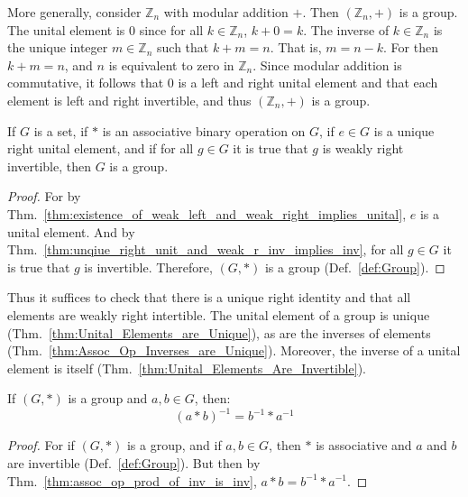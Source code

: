     \begin{example}
        More generally, consider $\mathbb{Z}_{n}$ with modular addition $+$.
        Then $(\mathbb{Z}_{n},+)$ is a group. The unital element is $0$ since
        for all $k\in\mathbb{Z}_{n}$, $k+0=k$. The inverse of
        $k\in\mathbb{Z}_{n}$ is the unique integer $m\in\mathbb{Z}_{n}$ such
        that $k+m=n$. That is, $m=n-k$. For then $k+m=n$, and $n$ is equivalent
        to zero in $\mathbb{Z}_{n}$. Since modular addition is commutative, it
        follows that $0$ is a left and right unital element and that each
        element is left and right invertible, and thus $(\mathbb{Z}_{n},+)$ is a
        group.
    \end{example}
    \begin{theorem}
        If $G$ is a set, if $*$ is an associative binary operation on $G$, if
        $e\in{G}$ is a unique right unital element, and if for all $g\in{G}$ it
        is true that $g$ is weakly right invertible, then $G$ is a group.
    \end{theorem}
    \begin{proof}
        For by
        Thm.~\ref{thm:existence_of_weak_left_and_weak_right_implies_unital},
        $e$ is a unital element. And by
        Thm.~\ref{thm:unqiue_right_unit_and_weak_r_inv_implies_inv}, for all
        $g\in{G}$ it is true that $g$ is invertible. Therefore, $(G,*)$ is a
        group (Def.~\ref{def:Group}).
    \end{proof}
    Thus it suffices to check that there is a unique right identity and that all
    elements are weakly right intertible. The unital element of a group is
    unique (Thm.~\ref{thm:Unital_Elements_are_Unique}), as are the inverses of
    elements (Thm.~\ref{thm:Assoc_Op_Inverses_are_Unique}). Moreover, the
    inverse of a unital element is itself
    (Thm.~\ref{thm:Unital_Elements_Are_Invertible}).
    \begin{theorem}
        \label{thm:Group_Inverse_of_Product}%
        If $(G,*)$ is a group and $a,b\in G$, then:
        \begin{equation}
            (a*b)^{\minus{1}}=b^{\minus{1}}*a^{\minus{1}}
        \end{equation}
    \end{theorem}
    \begin{proof}
        For if $(G,*)$ is a group, and if $a,b\in{G}$, then $*$ is associative
        and $a$ and $b$ are invertible (Def.~\ref{def:Group}). But then by
        Thm.~\ref{thm:assoc_op_prod_of_inv_is_inv},
        $a*b=b^{\minus{1}}*a^{\minus{1}}$.
    \end{proof}
